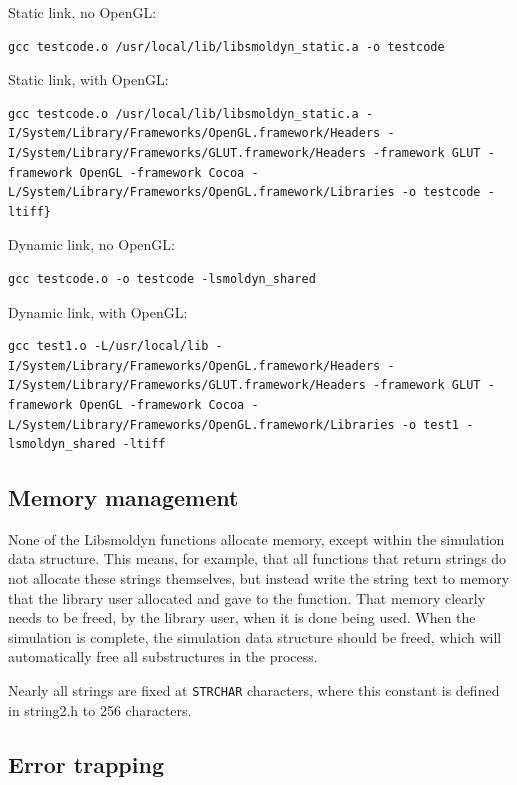 \documentclass {scrbook}
\newcommand {\ttt} {\texttt}
\begin{document}
Static link, no OpenGL:
\begin{lstlisting}[style=SSAC]
gcc testcode.o /usr/local/lib/libsmoldyn_static.a -o testcode
\end{lstlisting}

Static link, with OpenGL:
\begin{lstlisting}[style=SSAC]
gcc testcode.o /usr/local/lib/libsmoldyn_static.a -I/System/Library/Frameworks/OpenGL.framework/Headers -I/System/Library/Frameworks/GLUT.framework/Headers -framework GLUT -framework OpenGL -framework Cocoa -L/System/Library/Frameworks/OpenGL.framework/Libraries -o testcode -ltiff}
\end{lstlisting}

Dynamic link, no OpenGL:
\begin{lstlisting}[style=SSAC]
gcc testcode.o -o testcode -lsmoldyn_shared
\end{lstlisting}

Dynamic link, with OpenGL:
\begin{lstlisting}[style=SSAC]
gcc test1.o -L/usr/local/lib -I/System/Library/Frameworks/OpenGL.framework/Headers -I/System/Library/Frameworks/GLUT.framework/Headers -framework GLUT -framework OpenGL -framework Cocoa -L/System/Library/Frameworks/OpenGL.framework/Libraries -o test1 -lsmoldyn_shared -ltiff
\end{lstlisting}


\subsection*{Memory management}

None of the Libsmoldyn functions allocate memory, except within the simulation data structure. This means, for example, that all functions that return strings do not allocate these strings themselves, but instead write the string text to memory that the library user allocated and gave to the function. That memory clearly needs to be freed, by the library user, when it is done being used. When the simulation is complete, the simulation data structure should be freed, which will automatically free all substructures in the process.

Nearly all strings are fixed at \ttt{STRCHAR} characters, where this constant is defined in string2.h to 256 characters.


\subsection*{Error trapping}
\end{document}
